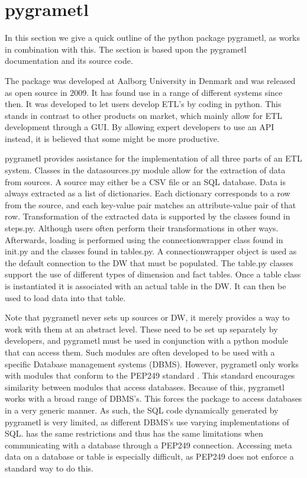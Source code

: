 \section{pygrametl}\label{sect:pygrametl}
In this section we give a quick outline of the python package pygrametl, as \FW{} works in combination with this. The section is based upon the pygrametl documentation and its source code\cite{pygramSource}.   

The package was developed at Aalborg University in Denmark and was released as open source in 2009. It has found use in a range of different systems since then. It was developed to let users develop ETL's by coding in python. This stands in contrast to other products on market, which mainly allow for ETL development through a GUI. By allowing expert developers to use an API instead, it is believed that some might be more productive.

pygrametl provides assistance for the implementation of all three parts of an ETL system. Classes in the datasources.py module allow for the extraction of data from sources. A source may either be a CSV file or an SQL database. Data is always extracted as a list of dictionaries. Each dictionary corresponds to a row from the source, and each key-value pair matches an attribute-value pair of that row. Transformation of the extracted data is supported by the classes found in steps.py. Although users often perform their transformations in other ways. Afterwards, loading is performed using the connectionwrapper class found in init.py and the classes found in tables.py. A connectionwrapper object is used as the default connection to the DW that must be populated. The table.py classes support the use of different types of dimension and fact tables. Once a table class is instantiated it is associated with an actual table in the DW. It can then be used to load data into that table. 

Note that pygrametl never sets up sources or DW, it merely provides a way to work with them at an abstract level. These need to be set up separately by developers, and pygrametl must be used in conjunction with a python module that can access them. Such modules are often developed to be used with a specific Database management systems (DBMS). However, pygrametl only works with modules that conform to the PEP249 standard \cite{pep249}. This standard encourages similarity between modules that access databases. Because of this, pygrametl works with a broad range of DBMS's. This forces the package to access databases in a very generic manner. As such, the SQL code dynamically generated by pygrametl is very limited, as different DBMS's use varying implementations of SQL. \FW{} has the same restrictions and thus has the same limitations when communicating with a database through a PEP249 connection. Accessing meta data on a database or table is especially difficult, as PEP249 does not enforce a standard way to do this. 
    
